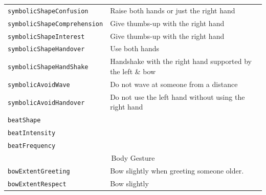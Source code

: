 \documentclass{CSSRforAfrica}
\begin{document}
\begin{table}[H]
\begin{center}
\begin{tabular}{|l l|}
{\footnotesize \verb+symbolicShapeConfusion+} 	                 & {\footnotesize \verb++ Raise  both hands or just the right hand}\vspace{-1.01mm} \\
{\footnotesize \verb+symbolicShapeComprehension+} 	                 & {\footnotesize \verb++ Give thumbs-up with the right hand}\vspace{-1.01mm} \\
{\footnotesize \verb+symbolicShapeInterest+} 	                 & {\footnotesize \verb++  Give thumbs-up with the right hand}\vspace{-1.01mm} \\
{\footnotesize \verb+symbolicShapeHandover+} 	                 & {\footnotesize \verb++ Use both hands}\vspace{-1.01mm} \\
{\footnotesize \verb+symbolicShapeHandShake+} 	                 & {\footnotesize \verb++ Handshake with the right hand supported by the left \& bow}\vspace{-1.01mm} \\
{\footnotesize \verb+symbolicAvoidWave+} 	                 & {\footnotesize \verb++ Do not wave at someone from a distance }\vspace{-1.01mm} \\
{\footnotesize \verb+symbolicAvoidHandover+} 	   & {\footnotesize \verb++ Do not use the left hand without using the right hand }\vspace{-1.01mm} \\
{\footnotesize \verb+beatShape+} 	                         & {\footnotesize \verb++}\vspace{-1.01mm} \\
{\footnotesize \verb+beatIntensity+} 	                 & {\footnotesize \verb++} \vspace{-1.01mm}\\
{\footnotesize \verb+beatFrequency+} 	                 & {\footnotesize \verb++} \\
\hline
\multicolumn{2}{|c|}{{\footnotesize Body Gesture}} \vspace{-0mm}\\
\hline
{\footnotesize \verb+bowExtentGreeting+} 	                        & {\footnotesize \verb++ Bow slightly when greeting someone older.} \vspace{-1.01mm}\\
{\footnotesize \verb+bowExtentRespect+} 	                        & {\footnotesize \verb++ Bow slightly} \vspace{-1.01mm}\\

\end{tabular}
\end{center}
\end{table}
\end{document}
